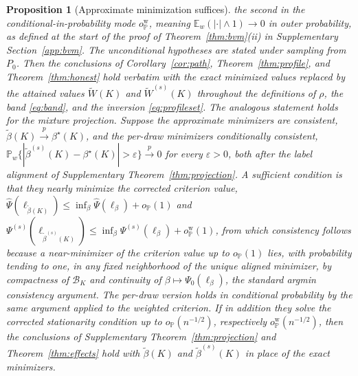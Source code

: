 \documentclass[11pt]{article}
\newtheorem{proposition}{Proposition}
\newcommand{\E}{\mathbb E}
\newcommand{\Pp}{\mathbb P}
\newcommand{\opro}{o_{\Pp}}
\newcommand{\pto}{\overset{p}{\to}}
\newcommand{\calB}{\mathcal B}
\newcommand{\hPsi}{\widehat\Psi}
\newcommand{\eps}{\varepsilon}
\begin{document}
\begin{proposition}[Approximate minimization suffices]
the second in the conditional-in-probability mode $\opro^{\mathrm w}$, meaning $\E_w(|\cdot|\wedge1)\to0$ in outer probability, as defined at the start of the proof of Theorem~\ref{thm:bvm}\textup{(ii)} in Supplementary Section~\ref{app:bvm}. The unconditional hypotheses are stated under sampling from $P_0$. Then the conclusions of Corollary~\ref{cor:path}, Theorem~\ref{thm:profile}, and Theorem~\ref{thm:honest} hold verbatim with the exact minimized values replaced by the attained values $\widetilde W(K)$ and $\widetilde W^{(s)}(K)$ throughout the definitions of $\rho$, the band \eqref{eq:band}, and the inversion \eqref{eq:profileset}. The analogous statement holds for the mixture projection. Suppose the approximate minimizers are consistent, $\tilde\beta(K)\pto\beta^\star(K)$, and the per-draw minimizers conditionally consistent, $\Pp_w\{|\tilde\beta^{(s)}(K)-\beta^\star(K)|>\eps\}\pto0$ for every $\eps>0$, both after the label alignment of Supplementary Theorem~\ref{thm:projection}. A sufficient condition is that they nearly minimize the corrected criterion value, $\hPsi(\ell_{\tilde\beta(K)})\le\inf_\beta\hPsi(\ell_\beta)+\opro(1)$ and $\Psi^{(s)}(\ell_{\tilde\beta^{(s)}(K)})\le\inf_\beta\Psi^{(s)}(\ell_\beta)+\opro^{\mathrm w}(1)$, from which consistency follows because a near-minimizer of the criterion value up to $\opro(1)$ lies, with probability tending to one, in any fixed neighborhood of the unique aligned minimizer, by compactness of $\calB_K$ and continuity of $\beta\mapsto\Psi_0(\ell_\beta)$, the standard argmin consistency argument. The per-draw version holds in conditional probability by the same argument applied to the weighted criterion. If in addition they solve the corrected stationarity condition up to $\opro(n^{-1/2})$, respectively $\opro^{\mathrm w}(n^{-1/2})$, then the conclusions of Supplementary Theorem~\ref{thm:projection} and Theorem~\ref{thm:effects} hold with $\tilde\beta(K)$ and $\tilde\beta^{(s)}(K)$ in place of the exact minimizers.
\end{proposition}
\end{document}
